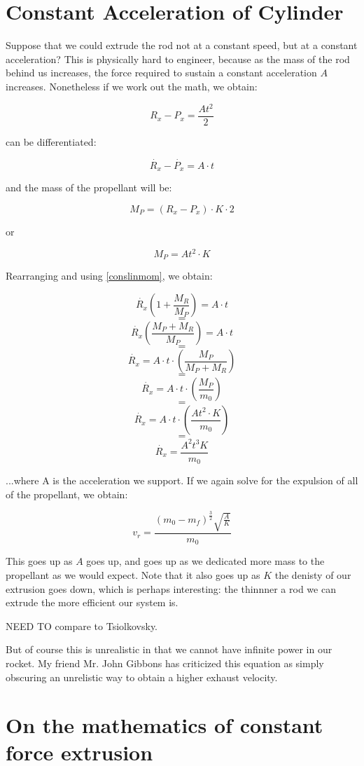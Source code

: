 \documentclass[11pt]{article}
\begin{document}
\section{Constant Acceleration of Cylinder}

Suppose that we could extrude the rod not at a constant speed, but
at a constant acceleration? This is physically hard to engineer,
because as the mass of the rod behind us increases, the force required
to sustain a constant acceleration $A$ increases. Nonetheless if we
work out the math, we obtain:

\[
\tag{Constant Acceleration} R_x - P_x  = \frac{A t^2}{2}
\]

\label{Constant Acceleration} can be differentiated:

\[
\tag{Velocities under C.A.} \dot{R_x} - \dot{P_x}  = A \cdot t
\]

and the mass of the propellant will be:

\[
 M_P = (R_x - P_x)\cdot K \cdot 2
\]

or

\[
 M_P = A t^2 \cdot K 
\]


Rearranging and using \eqref{conslinmom}, we obtain:

\[
\dot{R_x}(1 + \frac{M_R}{M_P} ) = A \cdot t
\]
\[
=
\]
\[
\dot{R_x}(\frac{M_P + M_R}{M_P} ) = A \cdot t
\]
\[
=
\]
\[
\dot{R_x} = A \cdot t \cdot (\frac{M_P}{M_P + M_R} )
\]
\[
=
\]
\[
\dot{R_x} = A \cdot t \cdot (\frac{M_P}{m_0} )
\]
\[
=
\]
\[
\dot{R_x} = A \cdot t \cdot (\frac{A t^2 \cdot K }{m_0} )
\]
\[
=
\]
\[
\dot{R_x} = \frac{A^2 t^3 K}{m_0}
\]

...where A is the acceleration we support. If we again solve for the
expulsion of all of the propellant, we obtain:

\[
v_r = \frac{(m_0 - m_f)^\frac{3}{2}\sqrt{\frac{A}{K}}}{m_0}
\]

This goes up as $A$ goes up, and goes up as we dedicated more mass to the propellant as we would expect.
Note that it also goes up as $K$ the denisty of our extrusion goes down, which is perhaps interesting:
the thinnner a rod we can extrude the more efficient our system is.

NEED TO compare to Tsiolkovsky.

But of course this is unrealistic in that we cannot have infinite power in our rocket.
My friend Mr. John Gibbons has criticized this equation as simply obscuring an unrelistic
way to obtain a higher exhaust velocity.

\section{On the mathematics of constant force extrusion}
\end{document}
